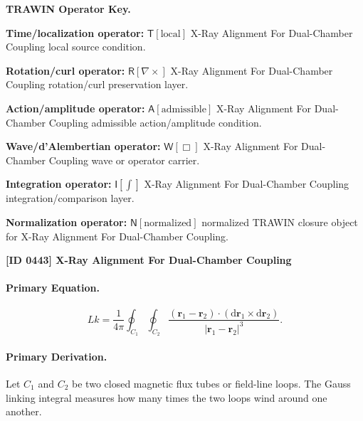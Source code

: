 \par\vspace{0.45\baselineskip}
\noindent\begin{minipage}[t]{\linewidth}
\begingroup
\small
\raggedright
\textbf{TRAWIN Operator Key.}\par
\noindent\textbf{Time/localization operator:} $\mathsf{T}\!\left[\mathrm{local}\right]$ X-Ray Alignment For Dual-Chamber Coupling local source condition.\par
\noindent\textbf{Rotation/curl operator:} $\mathsf{R}\!\left[\nabla\times\right]$ X-Ray Alignment For Dual-Chamber Coupling rotation/curl preservation layer.\par
\noindent\textbf{Action/amplitude operator:} $\mathsf{A}\!\left[\mathrm{admissible}\right]$ X-Ray Alignment For Dual-Chamber Coupling admissible action/amplitude condition.\par
\noindent\textbf{Wave/d'Alembertian operator:} $\mathsf{W}\!\left[\Box\right]$ X-Ray Alignment For Dual-Chamber Coupling wave or operator carrier.\par
\noindent\textbf{Integration operator:} $\mathsf{I}\!\left[\int\right]$ X-Ray Alignment For Dual-Chamber Coupling integration/comparison layer.\par
\noindent\textbf{Normalization operator:} $\mathsf{N}\!\left[\mathrm{normalized}\right]$ normalized TRAWIN closure object for X-Ray Alignment For Dual-Chamber Coupling.\par
\endgroup
\end{minipage}

\clearpage
\noindent\textbf{[ID 0443] X-Ray Alignment For Dual-Chamber Coupling}\par
\vspace{0.35em}
\paragraph{Primary Equation.}
\begin{equation}
Lk
=
\frac{1}{4\pi}
\oint_{C_1}
\oint_{C_2}
\frac{
(\mathbf{r}_1-\mathbf{r}_2)
\cdot
(\mathrm{d}\mathbf{r}_1\times \mathrm{d}\mathbf{r}_2)
}{
|\mathbf{r}_1-\mathbf{r}_2|^3
}.
\end{equation}

\paragraph{Primary Derivation.}
Let $C_1$ and $C_2$ be two closed magnetic flux tubes or field-line loops.  
The Gauss linking integral measures how many times the two loops wind around one another.

